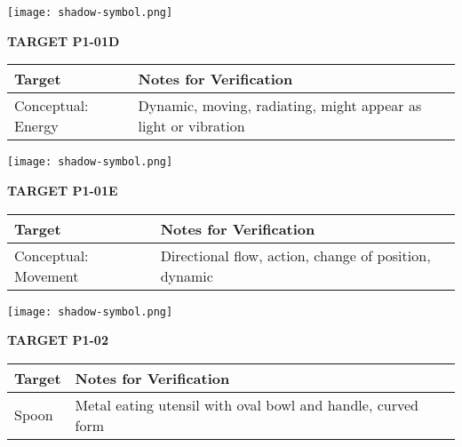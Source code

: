 \documentclass[10pt,twoside,final]{book} %
\makeatletter
\newcommand{\cleardoublepageWithSymbol}{%
  \clearpage %
  \if@twoside %
    \ifodd\c@page %
    \else %
      \thispagestyle{fancy} %
      \begingroup %
        \vspace*{0pt} %
        \vfill %
        \centering %
        \noindent 
        \texttt{[image: shadow-symbol.png]}
        \vfill %
      \endgroup
      \newpage    %
      \if@twocolumn\if@firstcolumn\else\hbox{}\newpage\fi\fi
    \fi
  \fi
}
\makeatother
\begin{document}
\cleardoublepageWithSymbol
\label{target:P1-01D}
\begin{center}
\Large\textbf{TARGET P1-01D}
\end{center}
\begin{mdframed}[backgroundcolor=white, linewidth=0.7pt, linecolor=rvprimary, shadow=true, shadowsize=1pt, shadowcolor=graydark!40, roundcorner=3pt]
\begin{tabular}{|p{3.5cm}|p{9cm}|}
\hline
\rowcolor{rvprimary!15}
\textbf{Target} & \textbf{Notes for Verification} \\
\hline
Conceptual: Energy & Dynamic, moving, radiating, might appear as light or vibration \\
\hline
\end{tabular}
\end{mdframed}


\cleardoublepageWithSymbol
\label{target:P1-01E}
\begin{center}
\Large\textbf{TARGET P1-01E}
\end{center}
\begin{mdframed}[backgroundcolor=white, linewidth=0.7pt, linecolor=rvprimary, shadow=true, shadowsize=1pt, shadowcolor=graydark!40, roundcorner=3pt]
\begin{tabular}{|p{3.5cm}|p{9cm}|}
\hline
\rowcolor{rvprimary!15}
\textbf{Target} & \textbf{Notes for Verification} \\
\hline
Conceptual: Movement & Directional flow, action, change of position, dynamic \\
\hline
\end{tabular}
\end{mdframed}


\cleardoublepageWithSymbol
\label{target:P1-02}
\begin{center}
\Large\textbf{TARGET P1-02}
\end{center}
\begin{mdframed}[backgroundcolor=white, linewidth=0.7pt, linecolor=rvprimary, shadow=true, shadowsize=1pt, shadowcolor=graydark!40, roundcorner=3pt]
\begin{tabular}{|p{3.5cm}|p{9cm}|}
\hline
\rowcolor{rvprimary!15}
\textbf{Target} & \textbf{Notes for Verification} \\
\hline
Spoon & Metal eating utensil with oval bowl and handle, curved form \\
\hline
\end{tabular}
\end{mdframed}
\end{document}
